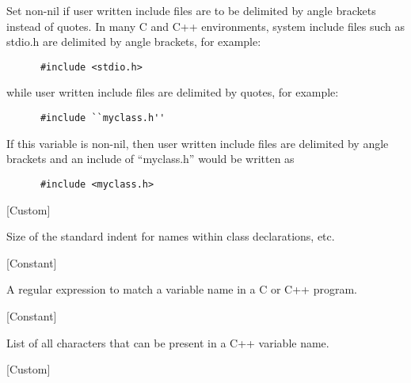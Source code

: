 \begin{doc-string}
Set non-nil if user written include files are to be delimited by
angle brackets instead of quotes.
In many C and C++ environments, system include files such as stdio.h are delimited
by angle brackets, for example:

\small{\begin{verbatim}
      #include <stdio.h>
\end{verbatim}}

while user written include files are delimited by quotes, for example:

\small{\begin{verbatim}
      #include ``myclass.h''
\end{verbatim}}

If this variable is non-nil, then user written include files are delimited
by angle brackets and an include of ``myclass.h'' would be written as

\small{\begin{verbatim}
      #include <myclass.h>
\end{verbatim}}
\end{doc-string}

\vspace{1em}
\noindent
{}
\usebox{\funcname}
 \hfill [Custom]

\begin{doc-string}
Size of the standard indent for names within class declarations, etc.
\end{doc-string}

\vspace{1em}
\noindent
{}
\usebox{\funcname}
 \hfill [Constant]

\begin{doc-string}
A regular expression to match a variable name in a C or C++ program.
\end{doc-string}

\vspace{1em}
\noindent
{}
\usebox{\funcname}
 \hfill [Constant]

\begin{doc-string}
List of all characters that can be present in a C++ variable name.
\end{doc-string}

\vspace{1em}
\noindent
{}
\usebox{\funcname}
 \hfill [Custom]

